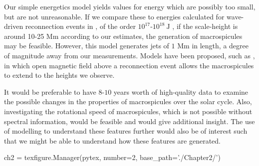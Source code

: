 Our simple energetics model yields values for energy which are possibly too small, but are not unreasonable. If we compare these to energies calculated for wave-driven reconnection events in \citealt{Heggland2009}, of the order $10^{17}$-$10^{18}\ \textrm{J}$ , if the scale-height is around 10-25 Mm according to our estimates, the generation of macrospicules may be feasible. However, this model generates jets of $1$ Mm in length, a degree of magnitude away from our measurements. Models have been proposed, such as \citealt{Adams2014}, in which open magnetic field above a reconnection event allows the macrospicules to extend to the heights we observe.


It would be preferable to have $8$-$10$ years worth of high-quality data to examine the possible changes in the properties of macrospicules over the solar cycle. Also, investigating the rotational speed of macrospicules, which is not possible without spectral information, would be feasible and would give additional insight. The use of modelling to understand these features further would also be of interest such that we might be able to understand how these features are generated.  















\begin{pycode}[chapter2]
ch2 = texfigure.Manager(pytex, number=2, base_path='./Chapter2/')
\end{pycode}
